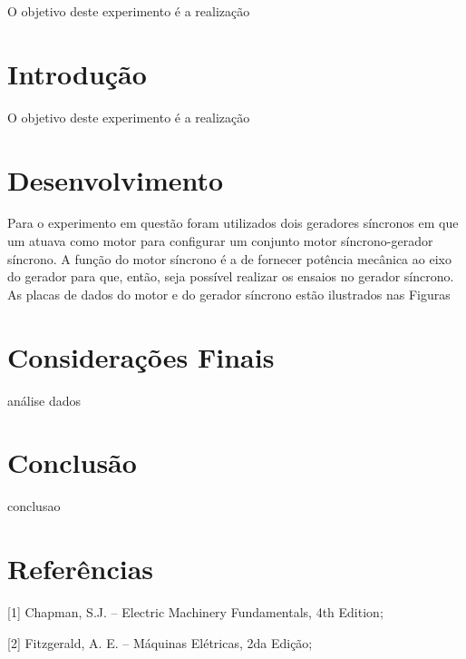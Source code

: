 \documentclass[a4paper, 12pt]{article}
\begin{document}
O objetivo deste experimento é a realização 

\section{Introdução}

O objetivo deste experimento é a realização 
\section{Desenvolvimento}

Para o experimento em questão foram utilizados dois geradores síncronos em que um atuava como motor para configurar um conjunto motor síncrono-gerador síncrono. A função do motor síncrono é a de fornecer potência mecânica ao eixo do gerador para que, então, seja possível realizar os ensaios no gerador síncrono. As placas de dados do motor e do gerador síncrono estão ilustrados nas Figuras 


\section{Considerações Finais}


análise dados
\section{Conclusão}

conclusao



\newpage
\section{Referências}

[1] Chapman, S.J. -- Electric Machinery Fundamentals, 4th Edition;

[2] Fitzgerald, A. E. -- Máquinas Elétricas, 2da Edição;
\end{document}
